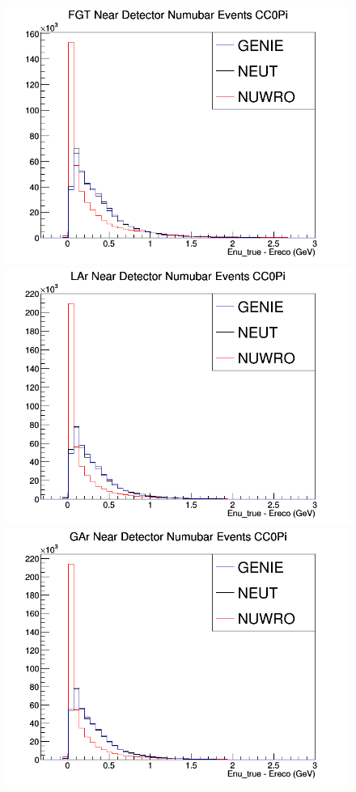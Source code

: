 \begin{figure}[h]
\endminipage
{}
\includegraphics[width=\linewidth]{Ereco_Etrue/numubar_FGT_CC0Pi.png}
\endminipage
{}
\includegraphics[width=\linewidth]{Ereco_Etrue/numubar_LAr_CC0Pi.png}
\endminipage
{}
\includegraphics[width=\linewidth]{Ereco_Etrue/numubar_GAr_CC0Pi.png}

\end{figure}
